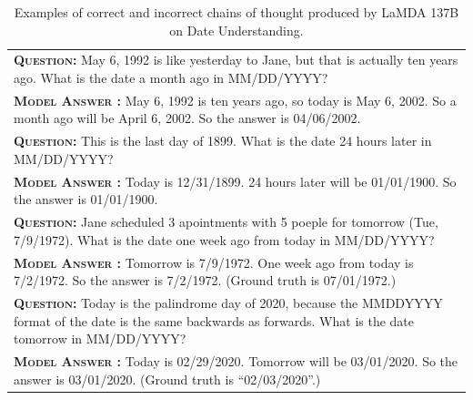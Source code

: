 \documentclass[]{article}
\newcommand{\xmark}{\ding{55}}%
\theoremstyle{plain}
\theoremstyle{definition}
\theoremstyle{remark}
\newcommand{\lamda}[0]{LaMDA}
\begin{document}
\endgroup
{}
\begingroup
\begin{table}[h]
    \caption{
    Examples of correct and incorrect chains of thought produced by \lamda{} 137B on Date Understanding.
    }
    \centering
    \small
    \begin{tabular}{p{\linewidth}}
        \toprule
        \vspace{-2mm}
        \textbf{\textsc{Question:}} May 6, 1992 is like yesterday to Jane, but that is actually ten years ago. What is the date a month ago in MM/DD/YYYY? \\
        \vspace{-1mm}
        \textbf{\textsc{Model Answer \color{darkGreen}{(CORRECT)}:}} May 6, 1992 is ten years ago, so today is May 6, 2002. So a month ago will be April 6, 2002. So the answer is 04/06/2002. \color{darkGreen}{\checkmark} \\
        \midrule
        \vspace{-2mm}
        \textbf{\textsc{Question:}} This is the last day of 1899. What is the date 24 hours later in MM/DD/YYYY? \\
        \vspace{-1mm}
        \textbf{\textsc{Model Answer \color{darkGreen}{(CORRECT)}:}} Today is 12/31/1899. 24 hours later will be 01/01/1900. So the answer is 01/01/1900. \color{darkGreen}{\checkmark} \\
        \midrule
        \vspace{-2mm}
        \textbf{\textsc{Question:}} Jane scheduled 3 apointments with 5 poeple for tomorrow (Tue, 7/9/1972). What is the date one week ago from today in MM/DD/YYYY? \\
        \vspace{-1mm}
        \textbf{\textsc{Model Answer \color{blue}{(INCORRECT)}:}} Tomorrow is 7/9/1972. {\color{blue} One week ago from today is 7/2/1972.} So the answer is 7/2/1972. {\color{blue} \xmark{} (Ground truth is 07/01/1972.)} \\
        \midrule
        \vspace{-2mm}
        \textbf{\textsc{Question:}} Today is the palindrome day of 2020, because the MMDDYYYY format of the date is the same backwards as forwards. What is the date tomorrow in MM/DD/YYYY? \\
        \vspace{-1mm}
        \textbf{\textsc{Model Answer \color{blue}{(INCORRECT)}:}} {\color{blue} Today is 02/29/2020.} Tomorrow will be 03/01/2020. So the answer is 03/01/2020. {\color{blue} \xmark{} (Ground truth is ``02/03/2020''.)} \\
        \bottomrule
    \end{tabular}
    \label{tab:appendix-date-understanding-examples}
\end{table}
\end{document}
